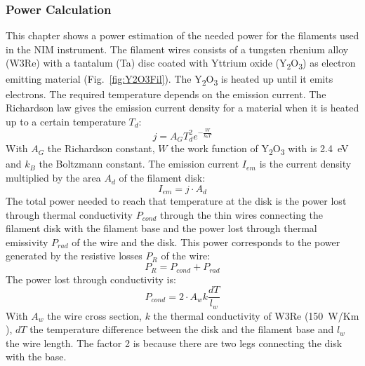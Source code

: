 		\subsubsection{Power Calculation}
		This chapter shows a power estimation of the needed power for the filaments used in the NIM instrument. The filament wires consists of a tungsten rhenium alloy (W3Re) with a tantalum (Ta) disc coated with Yttrium oxide (Y\textsubscript{2}O\textsubscript{3}) as electron emitting material (Fig.~\ref{fig:Y2O3Fil}). The Y\textsubscript{2}O\textsubscript{3} is heated up until it emits electrons. The required temperature depends on the emission current. The Richardson law gives the emission current density for a material when it is heated up to a certain temperature $T_d$:
		\begin{equation}
			j = A_GT_d^2e^{-\frac{W}{k_bT}}
			\label{eq:Richardson}
		\end{equation}
		With $A_G$ the Richardson constant, $W$ the work function of Y\textsubscript{2}O\textsubscript{3} with is 2.4~eV\cite{MaterHandbookCardaelli} and $k_B$ the Boltzmann constant. The emission current $I_{em}$ is the current density multiplied by the area $A_{d}$ of the filament disk:
		\begin{equation}
			I_{em} = j\cdot A_{d}
		\end{equation}
		The total power needed to reach that temperature at the disk is the power lost through thermal conductivity $P_{cond}$ through the thin wires connecting the filament disk with the filament base and the power lost through thermal emissivity $P_{rad}$ of the wire and the disk. This power corresponds to the power generated by the resistive losses $P_{R}$ of the wire:
		\begin{equation}
			P_{R} = P_{cond} + P_{rad}
		\end{equation}
		The power lost through conductivity is:
		\begin{equation}
			P_{cond} = 2\cdot A_{w}k\frac{dT}{l_{w}}
		\end{equation}
		With $A_{w}$ the wire cross section, $k$ the thermal conductivity of W3Re (150~W/Km \cite{thermcondTungst}), $dT$ the temperature difference between the disk and the filament base and $l_{w}$ the wire length. The factor 2 is because there are two legs connecting the disk with the base.\\ %
